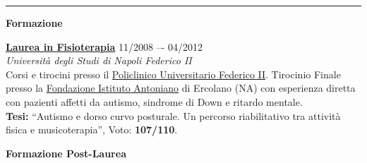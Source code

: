 \documentclass[a4paper]{article}
\newcommand{\block}[1]{\hrule \vspace{0.2cm} \textbf{\Large #1} \vspace{0.2cm}}
\newcommand{\blockNp}[1]{\newpage \textbf{\Large #1} \vspace{0.2cm}}
\newcommand{\voice}[5]{\href{#4}{\textbf{#1}} \hfill #2 \\ \textit{#3} \\ {\small #5} \vspace{0.2cm} \\}
\begin{document}

    \block{Formazione}

    \voice{Laurea in Fisioterapia}
    {11/2008 –- 04/2012}
    {Università degli Studi di Napoli Federico II%
    }
    {https://m78.corsidistudio.unina.it/}
    {
    Corsi e tirocini presso il \href{https://www.policlinico.unina.it/flex/cm/pages/ServeBLOB.php/L/IT/IDPagina/1}{Policlinico Universitario Federico II}.
    Tirocinio Finale presso la \href{https://www.istitutoantoniano.it/}{Fondazione Istituto Antoniano} di Ercolano (NA) con esperienza diretta con pazienti affetti da autismo, sindrome di Down e ritardo mentale.\\
    \textbf{Tesi:} “Autismo e dorso curvo posturale. Un percorso riabilitativo tra attività fisica e musicoterapia”, Voto: \textbf{107/110}.
    \vspace{-0.25cm}
    }

    \clearpage

    \blockNp{Formazione Post-Laurea}
\end{document}
